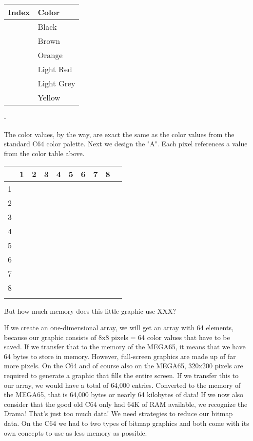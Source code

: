 \setlength\minrowclearance{4pt}
\begin{tabular}{m{22pt}|m{60pt}}
	Index & Color \\\hline
	\blk & Black \\	
	\bwn & Brown \\	
	\ora & Orange \\	
	\red & Light Red \\	
	\lgr & Light Grey \\			
	\yel & Yellow \\		
\end{tabular}-

The color values, by the way, are exact the same as the color values from the standard C64 color palette. Next we design the "A". Each pixel references a value from the color table above.


\setlength\minrowclearance{4pt}
\begin{tabular}{m{4pt}|m{4pt}m{4pt}m{4pt}m{4pt}m{4pt}m{4pt}m{4pt}m{4pt}m{4pt}}
	& 1 & 2 & 3& 4& 5& 6& 7& 8 &\\\hline
	
	1 & \blk & \blk & \blk & \blk & \blk & \blk & \blk & \blk & \\	
	2 & \red & \lgr & \yel & \lgr & \red & \ora & \blk & \blk & \\	
	3 & \lgr & \lgr & \blk & \blk & \ora & \red & \blk & \blk & \\	
	4 & \yel & \yel & \blk & \blk & \ora & \red & \blk & \blk & \\	
	5 & \yel & \lgr & \lgr & \red & \red & \red & \blk & \blk & \\	
	6 & \lgr & \red & \blk & \blk & \ora & \red & \blk & \blk & \\	
	7 & \red & \red & \blk & \blk & \red & \red & \blk & \blk & \\	
	8 & \ora & \bwn & \blk & \blk & \ora & \red & \blk & \blk & \\	

	&&&&&&&&&
\end{tabular}

But how much memory does this little graphic use XXX? 

If we create an one-dimensional array, we will get an array with 64 elements, because our graphic consists of 8x8 pixels = 64 color values that have to be saved. If we transfer that to the memory of the MEGA65, it means that we have 64 bytes to store in memory. However, full-screen graphics are made up of far more pixels. On the C64 and of course also on the MEGA65, 320x200 pixels are required to generate a graphic that fills the entire screen. If we transfer this to our array, we would have a total of 64,000 entries. Converted to the memory of the MEGA65, that is 64,000 bytes or nearly 64 kilobytes of data! If we now also consider that the good old C64 only had 64K of RAM available, we recognize the Drama! That's just too much data! We need strategies to reduce our bitmap data. On the C64 we had to two types of bitmap graphics and both come with its own concepts to use as less memory as possible.

